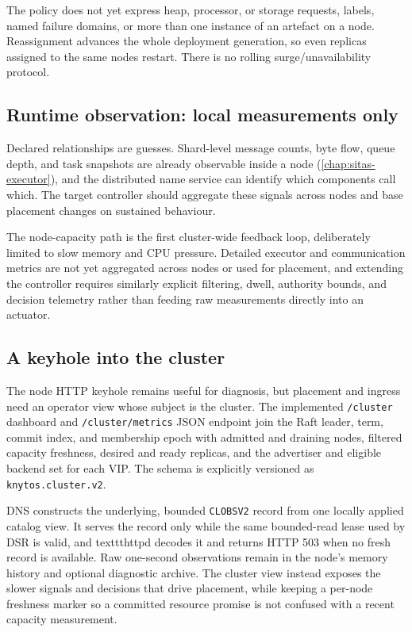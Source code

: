 The policy does not yet express heap, processor, or storage requests, labels,
named failure domains, or more than one instance of an artefact on a node.
Reassignment advances the whole deployment generation, so even replicas assigned
to the same nodes restart. There is no rolling surge/unavailability protocol.

\subsection{Runtime observation: local measurements only}

Declared relationships are guesses. Shard-level message counts, byte flow,
queue depth, and task snapshots are already observable inside a node
(\autoref{chap:sitas-executor}), and the distributed name service can identify which components
call which. The target controller should aggregate these signals across
nodes and base placement changes on sustained behaviour.

The node-capacity path is the first cluster-wide feedback loop, deliberately
limited to slow memory and CPU pressure. Detailed executor and communication
metrics are not yet aggregated across nodes or used for placement, and extending
the controller requires similarly explicit filtering, dwell, authority bounds,
and decision telemetry rather than feeding raw measurements directly into an
actuator.

\subsection{A keyhole into the cluster}
\label{sec:cluster-keyhole}

The node HTTP keyhole remains useful for diagnosis, but placement and ingress
need an operator view whose subject is the cluster. The implemented
\texttt{/cluster} dashboard and \texttt{/cluster/metrics} JSON endpoint join
the Raft leader, term, commit index, and membership epoch with admitted and
draining nodes, filtered capacity freshness, desired and ready replicas, and
the advertiser and eligible backend set for each VIP. The schema is explicitly
versioned as \texttt{knytos.cluster.v2}.

DNS constructs the underlying, bounded \texttt{CLOBSV2} record from one
locally applied catalog view. It serves the record only while the same
bounded-read lease used by DSR is valid, and texttt{httpd} decodes it and returns HTTP 503
when no fresh record is available. Raw one-second observations remain in the
node's memory history and optional diagnostic archive. The cluster view instead exposes the slower signals and
decisions that drive placement, while keeping a per-node freshness marker
so a committed resource promise is not confused with a recent capacity
measurement.

